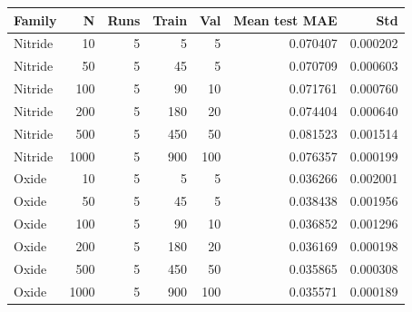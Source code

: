 \begin{tabular}{lrrrrrr}
\toprule
Family & N & Runs & Train & Val & Mean test MAE & Std \\
\midrule
Nitride & 10 & 5 & 5 & 5 & 0.070407 & 0.000202 \\
Nitride & 50 & 5 & 45 & 5 & 0.070709 & 0.000603 \\
Nitride & 100 & 5 & 90 & 10 & 0.071761 & 0.000760 \\
Nitride & 200 & 5 & 180 & 20 & 0.074404 & 0.000640 \\
Nitride & 500 & 5 & 450 & 50 & 0.081523 & 0.001514 \\
Nitride & 1000 & 5 & 900 & 100 & 0.076357 & 0.000199 \\
Oxide & 10 & 5 & 5 & 5 & 0.036266 & 0.002001 \\
Oxide & 50 & 5 & 45 & 5 & 0.038438 & 0.001956 \\
Oxide & 100 & 5 & 90 & 10 & 0.036852 & 0.001296 \\
Oxide & 200 & 5 & 180 & 20 & 0.036169 & 0.000198 \\
Oxide & 500 & 5 & 450 & 50 & 0.035865 & 0.000308 \\
Oxide & 1000 & 5 & 900 & 100 & 0.035571 & 0.000189 \\
\bottomrule
\end{tabular}
